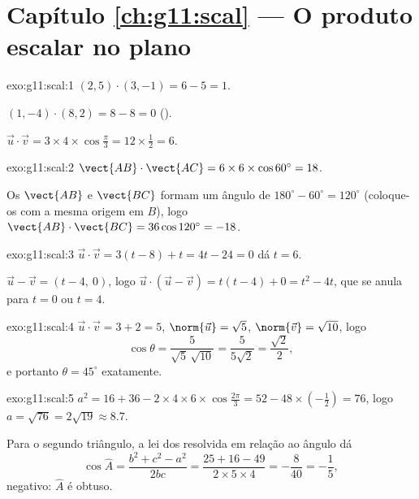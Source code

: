 \section*{Capítulo \ref{ch:g11:scal} --- O produto escalar no plano}

\begin{solution}{exo:g11:scal:1}
$(2,5)\cdot(3,-1) = 6 - 5 = 1$.

$(1,-4)\cdot(8,2) = 8 - 8 = 0$ ().

$\vec u\cdot\vec v = 3 \times 4 \times \cos\frac\pi3 = 12 \times \frac12
= 6$.
\end{solution}

\begin{solution}{exo:g11:scal:2}
$\vect{AB}\cdot\vect{AC} = 6 \times 6 \times \cos 60^\circ = 18$.

Os  $\vect{AB}$ e $\vect{BC}$ formam um ângulo de
$180^\circ - 60^\circ = 120^\circ$ (coloque-os com a mesma origem em
$B$), logo $\vect{AB}\cdot\vect{BC} = 36 \cos 120^\circ = -18$.
\end{solution}

\begin{solution}{exo:g11:scal:3}
$\vec u \cdot \vec v = 3(t - 8) + t = 4t - 24 = 0$ dá $t = 6$.

$\vec u - \vec v = (t - 4,\ 0)$, logo
$\vec u \cdot (\vec u - \vec v) = t(t-4) + 0 = t^2 - 4t$, que se anula
para $t = 0$ ou $t = 4$.
\end{solution}

\begin{solution}{exo:g11:scal:4}
$\vec u \cdot \vec v = 3 + 2 = 5$, $\norm{\vec u} = \sqrt5$,
$\norm{\vec v} = \sqrt{10}$, logo
\[
\cos\theta = \frac{5}{\sqrt5\,\sqrt{10}} = \frac{5}{5\sqrt2}
= \frac{\sqrt2}{2},
\]
e portanto $\theta = 45^\circ$ exatamente.
\end{solution}

\begin{solution}{exo:g11:scal:5}
$a^2 = 16 + 36 - 2 \times 4 \times 6 \times \cos\frac{2\pi}{3}
= 52 - 48 \times \left(-\frac12\right) = 76$, logo
$a = \sqrt{76} = 2\sqrt{19} \approx 8.7$.

Para o segundo triângulo, a lei dos  resolvida em relação ao
ângulo dá
\[
\cos\widehat A = \frac{b^2 + c^2 - a^2}{2bc}
= \frac{25 + 16 - 49}{2 \times 5 \times 4} = -\frac{8}{40} = -\frac15,
\]
negativo: $\widehat A$ é obtuso.
\end{solution}

